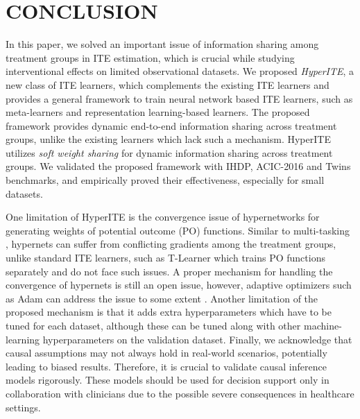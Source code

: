 \documentclass{article}
\begin{document}
\section{CONCLUSION}
\label{sec_conclusion}
In this paper, we solved an important issue of information sharing among treatment groups in ITE estimation, which is crucial while studying interventional effects on limited observational datasets. We proposed \textit{HyperITE}, a new class of ITE learners, which complements the existing ITE learners and provides a general framework to train neural network based ITE learners, such as meta-learners and representation learning-based learners. The proposed framework provides dynamic end-to-end information sharing across treatment groups, unlike the existing learners which lack such a mechanism. HyperITE utilizes \textit{soft weight sharing} for dynamic information sharing across treatment groups. We validated the proposed framework with IHDP, ACIC-2016 and Twins benchmarks, and empirically proved their effectiveness, especially for small datasets.

One limitation of HyperITE is the convergence issue of hypernetworks \cite{chang2020Principled} for generating weights of potential outcome (PO) functions. Similar to multi-tasking \cite{liu2021conflict}, hypernets can suffer from conflicting gradients among the treatment groups, unlike standard ITE learners, such as T-Learner which trains PO functions separately and do not face such issues. A proper mechanism for handling the convergence of hypernets is still an open issue, however, adaptive optimizers such as Adam can address the issue to some extent \cite{chang2020Principled}. Another limitation of the proposed mechanism is that it adds extra hyperparameters which have to be tuned for each dataset, although these can be tuned along with other machine-learning hyperparameters on the validation dataset.
Finally, we acknowledge that causal assumptions may not always hold in real-world scenarios, potentially leading to biased results. Therefore, it is crucial to validate causal inference models rigorously. These models should be used for decision support only in collaboration with clinicians due to the possible severe consequences in healthcare settings.
\end{document}

